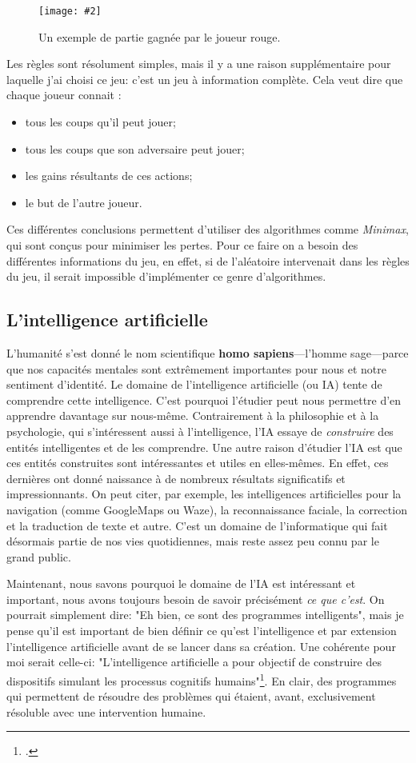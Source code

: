 \documentclass[a4paper]{article}
\newcommand{\img}[3][]{
    \begin{figure}[H]
        \centering
        \texttt{[image: \#2]}
        \caption{#1}    
    \end{figure}
}
\begin{document}
    \img[Un exemple de partie gagnée par le joueur rouge.]{Images/puissance4.jpg}{0.5}

    Les règles sont résolument simples, mais il y a une raison supplémentaire pour laquelle j'ai choisi ce jeu: c'est un jeu à information complète. Cela veut dire que chaque joueur connait : \begin{itemize}
        \item tous les coups qu'il peut jouer;
        \item tous les coups que son adversaire peut jouer;
        \item les gains résultants de ces actions;
        \item le but de l'autre joueur.
    \end{itemize}
    Ces différentes conclusions permettent d'utiliser des algorithmes comme \textit{Minimax}, qui sont conçus pour minimiser les pertes. Pour ce faire on a besoin des différentes informations du jeu, en effet, si de l'aléatoire intervenait dans les règles du jeu, il serait impossible d'implémenter ce genre d'algorithmes.

\subsection{L'intelligence artificielle}
    L'humanité s'est donné le nom scientifique \textbf{homo sapiens}---l'homme sage---parce que nos capacités mentales sont extrêmement importantes pour nous et notre sentiment d'identité. Le domaine de l'intelligence artificielle (ou IA) tente de comprendre cette intelligence. C'est pourquoi l'étudier peut nous permettre d'en apprendre davantage sur nous-même. Contrairement à la philosophie et à la psychologie, qui s'intéressent aussi à l'intelligence, l'IA essaye de \textit{construire} des entités intelligentes et de les comprendre. Une autre raison d'étudier l'IA est que ces entités construites sont intéressantes et utiles en elles-mêmes. En effet, ces dernières ont donné naissance à de nombreux résultats significatifs et impressionnants. On peut citer, par exemple, les intelligences artificielles pour la navigation (comme GoogleMaps ou Waze), la reconnaissance faciale, la correction et la traduction de texte et autre. C'est un domaine de l'informatique qui fait désormais partie de nos vies quotidiennes, mais reste assez peu connu par le grand public.

    Maintenant, nous savons pourquoi le domaine de l'IA est intéressant et important, nous avons toujours besoin de savoir précisément \textit{ce que c'est}. On pourrait simplement dire: "Eh bien, ce sont des programmes intelligents", mais je pense qu'il est important de bien définir ce qu'est l'intelligence et par extension l'intelligence artificielle avant de se lancer dans sa création. Une cohérente pour moi serait celle-ci: "L’intelligence artificielle a pour objectif de construire des dispositifs simulant les processus cognitifs humains"\footcite{haiech_2020}. En clair, des programmes qui permettent de résoudre des problèmes qui étaient, avant, exclusivement résoluble avec une intervention humaine.
\end{document}
